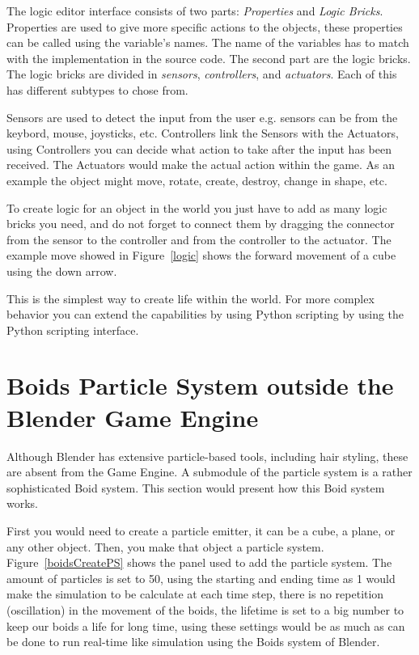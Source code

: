 The logic editor interface consists of two parts: \textit{Properties} and \textit{Logic Bricks}. Properties are used to give more specific actions to the objects, these properties can be called using the variable's names. The name of the variables has to match with the implementation in the source code. The second part are the logic bricks. The logic bricks are divided in \textit{sensors}, \textit{controllers}, and \textit{actuators}. Each of this has different subtypes to chose from.

Sensors are used to detect the input from the user e.g. sensors can be from the keybord, mouse, joysticks, etc. Controllers link the Sensors with the Actuators, using Controllers you can decide what action to take after the input has been received. The Actuators would make the actual action within the game. As an example the object might move, rotate, create, destroy, change in shape, etc.

To create logic for an object in the world you just have to add as many logic bricks you need, and do not forget to connect them by dragging the connector from the sensor to the controller and from the controller to the actuator. The example move showed in Figure~\ref{logic} shows the forward movement of a cube using the down arrow.

This is the simplest way to create life within the world. For more complex behavior you can extend the capabilities by using Python scripting by using the Python scripting interface.

\section{Boids Particle System outside the Blender Game Engine}
Although Blender has extensive particle-based tools, including hair styling, these are absent from the Game Engine. A submodule of the particle system is a rather sophisticated Boid system. This section would present how this Boid system works.

First you would need to create a particle emitter, it can be a cube, a plane, or any other object. Then, you make that object a particle system. Figure~\ref{boidsCreatePS} shows the panel used to add the particle system. The amount of particles is set to 50, using the starting and ending time as 1 would make the simulation to be calculate at each time step, there is no repetition (oscillation) in the movement of the boids, the lifetime is set to a big number to keep our boids a life for long time, using these settings would be as much as can be done to run real-time like simulation using the Boids system of Blender.


